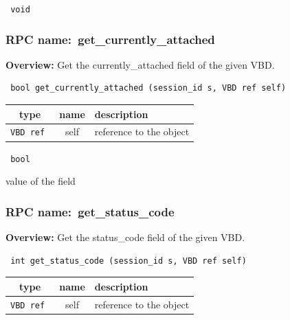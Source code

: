 \vspace{0.3cm}

{\tt 
void
}



\vspace{0.3cm}
\vspace{0.3cm}
\vspace{0.3cm}
\subsubsection{RPC name:~get\_currently\_attached}

{\bf Overview:} 
Get the currently\_attached field of the given VBD.

\begin{verbatim} bool get_currently_attached (session_id s, VBD ref self)\end{verbatim}



 
\vspace{0.3cm}
\begin{tabular}{|c|c|p{7cm}|}
 \hline
{\bf type} & {\bf name} & {\bf description} \\ \hline
{\tt VBD ref } & self & reference to the object \\ \hline 

\end{tabular}

\vspace{0.3cm}

{\tt 
bool
}


value of the field
\vspace{0.3cm}
\vspace{0.3cm}
\vspace{0.3cm}
\subsubsection{RPC name:~get\_status\_code}

{\bf Overview:} 
Get the status\_code field of the given VBD.

\begin{verbatim} int get_status_code (session_id s, VBD ref self)\end{verbatim}



 
\vspace{0.3cm}
\begin{tabular}{|c|c|p{7cm}|}
 \hline
{\bf type} & {\bf name} & {\bf description} \\ \hline
{\tt VBD ref } & self & reference to the object \\ \hline 

\end{tabular}

